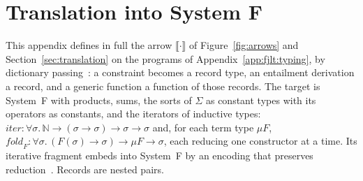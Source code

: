 \section{Translation into System F}
\label{app:fjlt:translation}
\newcommand{\note}[1]{\parbox[t]{0.27\linewidth}{\raggedright\footnotesize #1}}

This appendix defines in full the arrow $\llbracket\cdot\rrbracket$ of Figure~\ref{fig:arrows} and Section~\ref{sec:translation} on the programs of Appendix~\ref{app:fjlt:typing}, by dictionary passing~\cite{wadler1989adhoc}: a constraint becomes a record type, an entailment derivation a record, and a generic function a function of those records.
The target is System~F with products, sums, the sorts of $\Sigma$ as constant types with its operators as constants, and the iterators of inductive types: $\mathit{iter} : \forall\sigma.\,\mathbb{N} \to (\sigma \to \sigma) \to \sigma \to \sigma$ and, for each term type $\mu F$, $\mathit{fold}_F : \forall\sigma.\,(F(\sigma) \to \sigma) \to \mu F \to \sigma$, each reducing one constructor at a time.
Its iterative fragment embeds into System~F by an encoding that preserves reduction~\cite{matthes1999extensions}.
Records are nested pairs.

